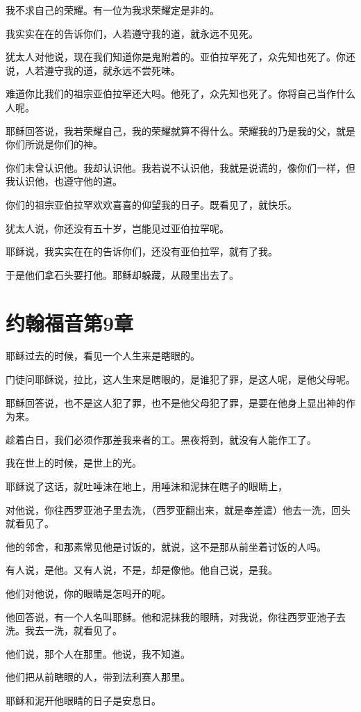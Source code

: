 \documentclass[12pt,oneside]{book}
\begin{document}
我不求自己的荣耀。有一位为我求荣耀定是非的。

我实实在在的告诉你们，人若遵守我的道，就永远不见死。

犹太人对他说，现在我们知道你是鬼附着的。亚伯拉罕死了，众先知也死了。你还说，人若遵守我的道，就永远不尝死味。

难道你比我们的祖宗亚伯拉罕还大吗。他死了，众先知也死了。你将自己当作什么人呢。

耶稣回答说，我若荣耀自己，我的荣耀就算不得什么。荣耀我的乃是我的父，就是你们所说是你们的神。

你们未曾认识他。我却认识他。我若说不认识他，我就是说谎的，像你们一样，但我认识他，也遵守他的道。

你们的祖宗亚伯拉罕欢欢喜喜的仰望我的日子。既看见了，就快乐。

犹太人说，你还没有五十岁，岂能见过亚伯拉罕呢。

耶稣说，我实实在在的告诉你们，还没有亚伯拉罕，就有了我。

于是他们拿石头要打他。耶稣却躲藏，从殿里出去了。

\chapter{约翰福音第9章}
耶稣过去的时候，看见一个人生来是瞎眼的。

门徒问耶稣说，拉比，这人生来是瞎眼的，是谁犯了罪，是这人呢，是他父母呢。

耶稣回答说，也不是这人犯了罪，也不是他父母犯了罪，是要在他身上显出神的作为来。

趁着白日，我们必须作那差我来者的工。黑夜将到，就没有人能作工了。

我在世上的时候，是世上的光。

耶稣说了这话，就吐唾沫在地上，用唾沫和泥抹在瞎子的眼睛上，

对他说，你往西罗亚池子里去洗，（西罗亚翻出来，就是奉差遣）他去一洗，回头就看见了。

他的邻舍，和那素常见他是讨饭的，就说，这不是那从前坐着讨饭的人吗。

有人说，是他。又有人说，不是，却是像他。他自己说，是我。

他们对他说，你的眼睛是怎吗开的呢。

他回答说，有一个人名叫耶稣。他和泥抹我的眼睛，对我说，你往西罗亚池子去洗。我去一洗，就看见了。

他们说，那个人在那里。他说，我不知道。

他们把从前瞎眼的人，带到法利赛人那里。

耶稣和泥开他眼睛的日子是安息日。
\end{document}
